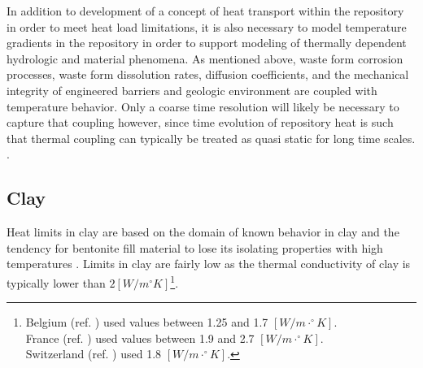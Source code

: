 \documentclass[letterpaper]{article}
\begin{document}

 In addition to development of a concept of heat transport within the repository 
 in order to meet heat load limitations, it is also necessary to model 
 temperature gradients in the repository in  order to support modeling of 
 thermally dependent hydrologic and material phenomena.  As mentioned above, 
 waste form corrosion processes, waste form
 dissolution rates, diffusion coefficients, and the mechanical integrity of 
 engineered barriers and geologic environment are coupled with temperature 
 behavior. 
 Only a coarse time resolution will likely be necessary to capture that coupling 
 however, since time evolution of repository heat is
 such that thermal coupling can typically be treated as quasi static for long 
 time scales.
 \cite{andra_argile:_2005}. %

\subsection{Clay}
\label{subsec:claythermal}


Heat limits in clay are based on the domain of known behavior in clay and the 
tendency for bentonite fill material to lose its isolating properties with high 
temperatures \cite{andra_argile:_2005, pusch_alteration_1987}. Limits in clay 
are fairly low as the thermal conductivity of clay is typically lower than 
$2[W/m^{\circ}K]$\footnote{
  Belgium (ref. \cite{ondraf-niras_technical_2001}) used values between 1.25 and 
  1.7 $[W/m\cdot^{\circ}K]$.\\
  France (ref. \cite{andra_argile:_2005}) used values between 1.9 and 2.7 
  $[W/m\cdot^{\circ}K]$.\\
  Switzerland (ref. \cite{johnson_calculations_2003}) used 1.8 
  $[W/m\cdot^{\circ}K]$.
}.
\end{document}
